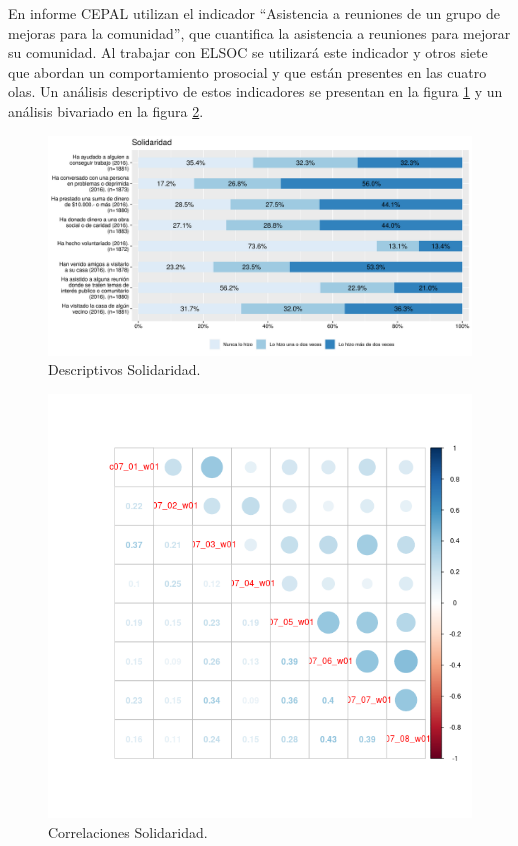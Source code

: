 \documentclass[
  12pt,
]{book}
\begin{document}
En informe CEPAL utilizan el indicador ``Asistencia a reuniones de un grupo de mejoras para la comunidad'', que cuantifica la asistencia a reuniones para mejorar su comunidad. Al trabajar con ELSOC se utilizará este indicador y otros siete que abordan un comportamiento prosocial y que están presentes en las cuatro olas. Un análisis descriptivo de estos indicadores se presentan en la figura \ref{fig:solidaridad} y un análisis bivariado en la figura \ref{fig:solidaridad-cor}.

\begin{figure}[H]

{\centering \includegraphics[width=1\linewidth,height=1\textheight]{output/graphs/solidaridad} 

}

\caption{Descriptivos Solidaridad.}\label{fig:solidaridad}
\end{figure}

\begin{figure}[H]

{\centering \includegraphics[width=1\linewidth,height=1\textheight]{output/graphs/solidaridad_cor} 

}

\caption{Correlaciones Solidaridad.}\label{fig:solidaridad-cor}
\end{figure}
\end{document}
